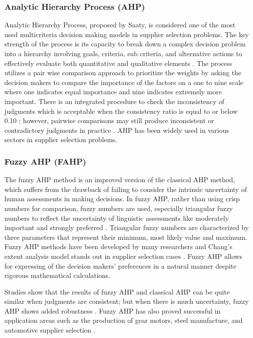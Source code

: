 \documentclass[11pt]{article}
\begin{document}
\subsubsection{Analytic Hierarchy Process (AHP)}

Analytic Hierarchy Process, proposed by Saaty, is considered one of the most used multicriteria decision making models in supplier selection problems. The key strength of the process is its capacity to break down a complex decision problem into a hierarchy involving goals, criteria, sub criteria, and alternative actions to effectively evaluate both quantitative and qualitative elements \cite{ref13}. The process utilizes a pair wise comparison approach to prioritize the weights by asking the decision makers to compare the importance of the factors on a one to nine scale where one indicates equal importance and nine indicates extremely more important. There is an integrated procedure to check the inconsistency of judgments which is acceptable when the consistency ratio is equal to or below 0.10 \cite{ref13}; however, pairwise comparisons may still produce inconsistent or contradictory judgments in practice \cite{ref71}. AHP has been widely used in various sectors in supplier selection problems.

\subsubsection{Fuzzy AHP (FAHP)}

The fuzzy AHP method is an improved version of the classical AHP method, which suffers from the drawback of failing to consider the intrinsic uncertainty of human assessments in making decisions. In fuzzy AHP, rather than using crisp numbers for comparison, fuzzy numbers are used, especially triangular fuzzy numbers to reflect the uncertainty of linguistic assessments like moderately important and strongly preferred \cite{ref25,ref69}. Triangular fuzzy numbers are characterized by three parameters that represent their minimum, most likely value and maximum. Fuzzy AHP methods have been developed by many researchers and Chang's extent analysis model stands out in supplier selection cases \cite{ref35}. Fuzzy AHP allows for expressing of the decision makers' preferences in a natural manner despite rigorous mathematical calculations.

Studies show that the results of fuzzy AHP and classical AHP can be quite similar when judgments are consistent; but when there is much uncertainty, fuzzy AHP shows added robustness \cite{ref35}. Fuzzy AHP has also proved successful in application areas such as the production of gear motors, steel manufacture, and automotive supplier selection \cite{ref25}.
\end{document}

